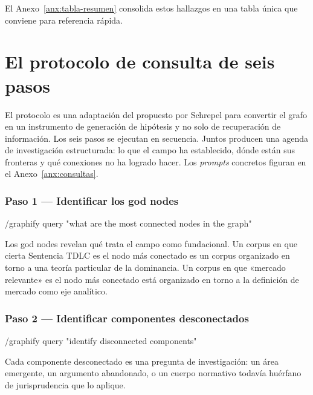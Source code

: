 \documentclass[12pt,a4paper]{article}
\begin{document}
\noindent
El Anexo~\ref{anx:tabla-resumen} consolida estos hallazgos en una tabla única
que conviene para referencia rápida.

\section{El protocolo de consulta de seis pasos}
\label{sec:protocolo}

El protocolo es una adaptación del propuesto por Schrepel para convertir el
grafo en un instrumento de generación de hipótesis y no solo de recuperación de
información.\autocite{schrepel2026brain} Los seis pasos se ejecutan en
secuencia. Juntos producen una agenda de investigación estructurada: lo que el
campo ha establecido, dónde están sus fronteras y qué conexiones no ha logrado
hacer. Los \emph{prompts} concretos figuran en el Anexo~\ref{anx:consultas}.

\subsubsection*{Paso 1 — Identificar los god nodes}

\begin{codebox}
/graphify query "what are the most connected nodes in the graph"
\end{codebox}

Los god nodes revelan qué trata el campo como fundacional. Un corpus en que
cierta Sentencia TDLC es el nodo más conectado es un corpus organizado en torno
a una teoría particular de la dominancia. Un corpus en que «mercado relevante»
es el nodo más conectado está organizado en torno a la definición de mercado
como eje analítico.

\subsubsection*{Paso 2 — Identificar componentes desconectados}

\begin{codebox}
/graphify query "identify disconnected components"
\end{codebox}

Cada componente desconectado es una pregunta de investigación: un área
emergente, un argumento abandonado, o un cuerpo normativo todavía huérfano de
jurisprudencia que lo aplique.
\end{document}
